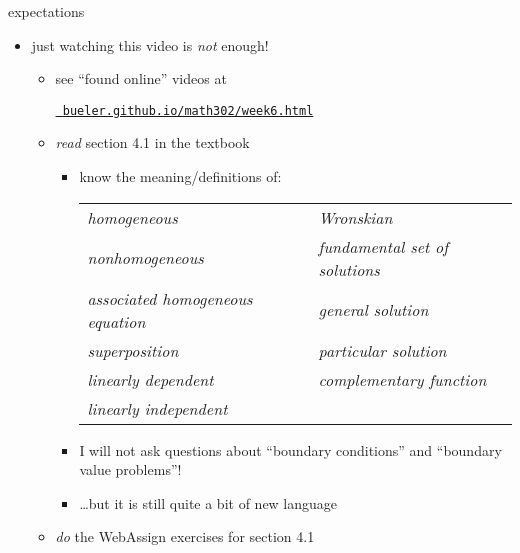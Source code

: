 \documentclass{beamer}
\begin{document}
\begin{frame}{expectations}

\begin{itemize}
\item just watching this video is \emph{not} enough!
     \begin{itemize}
     \item see ``found online'' videos at

     \centerline{\href{https://bueler.github.io/math302/week6.html}{\tt \color{cyan} bueler.github.io/math302/week6.html}}
     \item \emph{read} section 4.1 in the textbook
         \begin{itemize}
         \item know the meaning/definitions of:

\bigskip
             \hspace{-10mm} \begin{tabular}{ll}
             \emph{homogeneous}                     & \emph{Wronskian} \\
             \emph{nonhomogeneous}                  & \emph{fundamental set of solutions} \\
             \emph{associated homogeneous equation} & \emph{general solution} \\
             \emph{superposition}                   & \emph{particular solution} \\
             \emph{linearly dependent}              & \emph{complementary function} \\
             \emph{linearly independent}            &
             \end{tabular}

\bigskip
         \item I will not ask questions about ``boundary conditions'' and ``boundary value problems''!
         \item \dots but it is still quite a bit of new language
         \end{itemize}
     \item \emph{do} the WebAssign exercises for section 4.1
     \end{itemize}
\end{itemize}
\end{frame}
\end{document}
